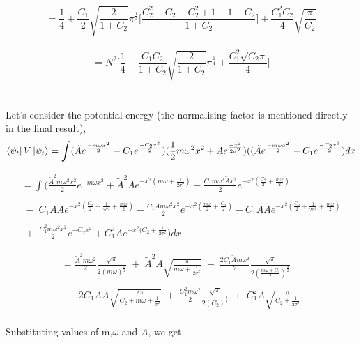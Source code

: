 \documentclass[12pt]{article}
\begin{document}
\[= \frac{1}{4} + \frac{C_1}{2} \sqrt{\frac{2}{1 + C_2}} \pi^\frac{1}{4} \Big [\frac{C_2^2 - C_2 -C_2^2 +1 - 1 - C_2}{1 + C_2} 
\Big] + \frac{C_1^2 C_2}{4} \sqrt{\frac{\pi}{C_2}} \]
\\
\begin{equation}
  = N^2 \Big[\frac{1}{4} - \frac{C_1 C_2}{1 + C_2}\sqrt{\frac{2}{1 + C_2}} \pi^\frac{1}{4} + \frac{C_1^2 \sqrt{C_2 \pi}}{4} \Bigg]
\end{equation}
\\
\\
Let's consider the potential energy (the normalising factor is mentioned directly in the final result), 
\[\bra{\psi_t}V\ket{\psi_t} = \int(\tilde{A}e^{\frac{-m \omega x^2}{2}} - C_1e^{\frac{-C_2 x^2}{2}})(\frac{1}{2}m\omega^2 x^{2} + 
A e^{\frac{-x^2}{2\sigma^2}}) ((\tilde{A}e^{\frac{-m \omega x^2}{2}} - C_1e^{\frac{-C_2 x^2}{2}}) dx\]

\begin{multline*}
= \int ( \frac{\tilde{A}^2 m \omega^2 x^2}{2} e^{-m\omega x^2} + \tilde{A}^2 A e^{-x^2(m\omega + \frac{1}{2 \sigma^2})} - 
\frac{C_1 m \omega^2 \tilde{A}x^2}{2} e^{-x^2(\frac{C_2}{2} + \frac{m \omega}{2})} \\
\\
\;-\; C_1 A \tilde{A} e^{-x^2(\frac{C_2}{2} + \frac{1}{2 \sigma^2} + \frac{m \omega}{2})} - \frac{C_1 \tilde{A}m 
\omega^2 x^2}{2} e^{-x^2 (\frac{m \omega}{2} + \frac{C_2}{2})} - C_1 A \tilde{A} e^{-x^2 (\frac{C_2}{2} + \frac{1}{2 \sigma^2} + \frac{m \omega}{2})} \\
\\
\;+\; \frac{C_1^2 m \omega^2 x^2}{2} e^{-C_2 x^2} + C_1^2 A e^{-x^2(C_2 + \frac{1}{2 \sigma^2}} ) dx 
\end{multline*}
\newpage

\begin{multline*}
= \frac{\tilde{A}^2 m \omega^2}{2} \frac{\sqrt{\pi}}{2 (m\omega)^\frac{3}{2}} \;+\; \tilde{A}^2 A \sqrt{\frac{\pi}{m 
\omega + \frac{1}{2 \sigma^2}}} \;-\; \frac{2 C_1 \tilde{A} m \omega^2}{2} \frac{\sqrt{\pi}}{2 (\frac{m \omega + C_2}{2})^\frac{3}{2}} \\
\\
\;-\; 2 C_1 A \tilde{A} \sqrt{\frac{2 \pi}{C_2 + m\omega + \frac{1}{\sigma^2}}} \;+\; \frac{C_1^2 m \omega^2}{2} 
\frac{\sqrt{\pi}}{2 (C_2)^\frac{3}{2}} \;+\; C_1^2 A \sqrt{\frac{\pi}{C_2 + \frac{1}{2 \sigma^2}}}
\end{multline*}
\\
Substituting values of m,$\omega$ and $\tilde{A}$, we get 
\end{document}
